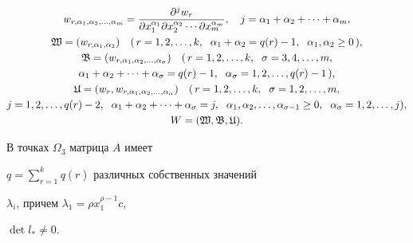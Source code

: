 \begin{gather*}


w_{r,\alpha_1,\alpha_2,\dotsc,\alpha_m}=


\frac{\partial^j w_r}


{\partial x^{\alpha_1}_1 \partial x^{\alpha_2}_2


\dotsb\partial x^{\alpha_m}_m},\quad


j=\alpha_1+\alpha_2+\dotsb+\alpha_m,\\


\frak W=(w_{r,\alpha_1,\alpha_2})\quad


(\,r=1,2,\dotsc,k,\ \;\alpha_1+\alpha_2=q(r)-1,\ \;


\alpha_1,\alpha_2\ge 0\,),\\


\frak B=(w_{r,\alpha_1,\alpha_2,\dotsc,\alpha_\sigma})\quad


(\,r=1,2,\dotsc,k,\ \;\sigma=3,4,\dotsc,m,\\


\alpha_1+\alpha_2+\dotsb+\alpha_\sigma=q(r)-1,\ \;


\alpha_\sigma=1,2,\dotsc,q(r)-1\,),\\


\frak U=(w_r,w_{r,\alpha_1,\alpha_2,\dotsc,\alpha_\alpha})\quad


(\,r=1,2,\dotsc,k,\ \;\sigma=1,2,\dotsc,m,\\


j=1,2,\dotsc,q(r)-2,\ \;\alpha_1+\alpha_2+\dotsb+\alpha_\sigma=j,


\ \;\alpha_1,\alpha_2,\dotsc,\alpha_{\sigma-1}\ge 0,\ \;


\alpha_\sigma=1,2,\dotsc,j),\\


W=(\frak W,\frak B,\frak U).


\end{gather*}





\begin{conjec}


В точках $\Omega_3$ матрица $A$ имеет


$q=\sum\limits^k_{r=1}q(r)$ различных собственных значений


$\lambda_i$, причем $\lambda_1=\rho x^{\rho-1}_1c$,


$\det l_*\ne 0$.


\end{conjec}





